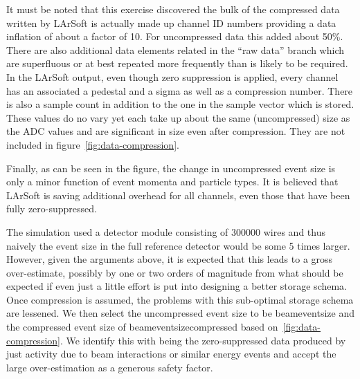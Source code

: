 It must be noted that this exercise discovered the bulk of the
compressed data written by LArSoft is actually made up channel ID
numbers providing a data inflation of about a factor of 10.
For uncompressed data this added about 50\%.
There are also additional data elements related in the ``raw data''
branch which are superfluous or at best repeated more frequently than
is likely to be required.
In the LArSoft output, even though zero suppression is applied, every
channel has an associated a pedestal and a sigma as well as a
compression number.
There is also a sample count in addition to the one in the sample
vector which is stored.
These values do no vary yet each take up about the same (uncompressed)
size as the ADC values and are significant in size even after
compression.
They are not included in figure~\ref{fig:data-compression}.

Finally, as can be seen in the figure, the change in uncompressed
event size is only a minor function of event momenta and particle types.
It is believed that LArSoft is saving additional overhead for all
channels, even those that have been fully zero-suppressed.

The simulation used a detector module consisting of 300000 wires and
thus naively the event size in the full reference detector would be some 5 times
larger.
However, given the arguments above, it is expected that this leads to
a gross over-estimate, possibly by one or two orders of magnitude from
what should be expected if even just a little effort is put into
designing a better storage schema.
Once compression is assumed, the problems with this sub-optimal
storage schema are lessened.
We then select the uncompressed event size to be beameventsize and
the compressed event size of beameventsizecompressed based
on~\ref{fig:data-compression}.
We identify this with being the zero-suppressed data produced by just
activity due to beam interactions or similar energy events and accept
the large over-estimation as a generous safety factor.






